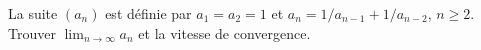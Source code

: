 La suite $(a_n)$ est définie par $a_1 = a_2 = 1$ et $a_n = 1/a_{n-1} + 1/a_{n-2}$, $n \geq 2$. Trouver $\lim_{n\to\infty} a_n$ et la vitesse de convergence.
